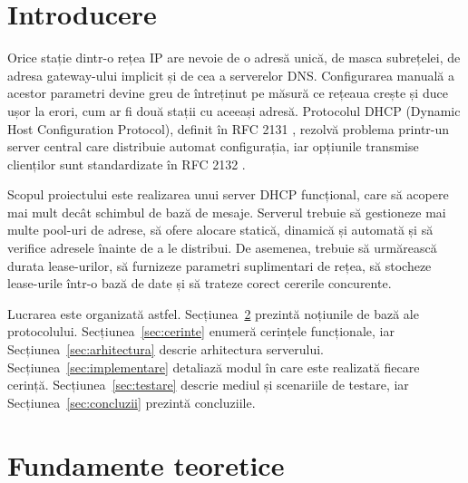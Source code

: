 \documentclass[conference]{IEEEtran}
\begin{document}
\section{Introducere}
Orice stație dintr-o rețea IP are nevoie de o adresă unică, de masca subrețelei, de adresa gateway-ului implicit și de cea a serverelor DNS. Configurarea manuală a acestor parametri devine greu de întreținut pe măsură ce rețeaua crește și duce ușor la erori, cum ar fi două stații cu aceeași adresă. Protocolul DHCP (Dynamic Host Configuration Protocol), definit în RFC 2131 \cite{rfc2131}, rezolvă problema printr-un server central care distribuie automat configurația, iar opțiunile transmise clienților sunt standardizate în RFC 2132 \cite{rfc2132}.

Scopul proiectului este realizarea unui server DHCP funcțional, care să acopere mai mult decât schimbul de bază de mesaje. Serverul trebuie să gestioneze mai multe pool-uri de adrese, să ofere alocare statică, dinamică și automată și să verifice adresele înainte de a le distribui. De asemenea, trebuie să urmărească durata lease-urilor, să furnizeze parametri suplimentari de rețea, să stocheze lease-urile într-o bază de date și să trateze corect cererile concurente.

Lucrarea este organizată astfel. Secțiunea~\ref{sec:fundamente} prezintă noțiunile de bază ale protocolului. Secțiunea~\ref{sec:cerinte} enumeră cerințele funcționale, iar Secțiunea~\ref{sec:arhitectura} descrie arhitectura serverului. Secțiunea~\ref{sec:implementare} detaliază modul în care este realizată fiecare cerință. Secțiunea~\ref{sec:testare} descrie mediul și scenariile de testare, iar Secțiunea~\ref{sec:concluzii} prezintă concluziile.

\section{Fundamente teoretice}\label{sec:fundamente}
\end{document}
